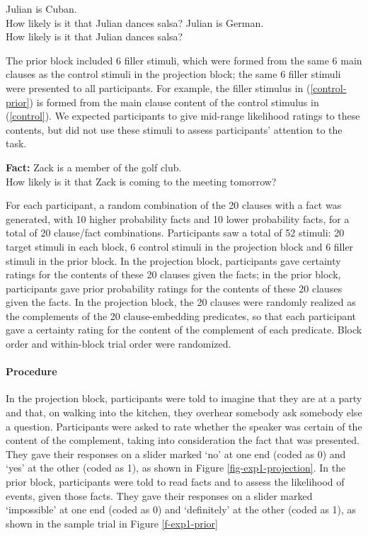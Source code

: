 \documentclass[11pt,fleqn]{article}
\newcommand{\6}{\mbox{$[\hspace*{-.6mm}[$}}
\newcommand{\9}{\mbox{$]\hspace*{-.6mm}]$}}
\begin{document}
\begin{exe}
\ex\label{target} 
\begin{xlist}
 Julian is Cuban. \\ How likely is it that Julian dances salsa?
 Julian is German. \\ How likely is it that Julian dances salsa?
\end{xlist}
\end{exe}
The prior block included 6 filler stimuli, which were formed from the same 6 main clauses as the control stimuli in the projection block; the same 6 filler stimuli were presented to all participants. For example, the filler stimulus in (\ref{control-prior}) is formed from the main clause content of the control stimulus in (\ref{control}). We expected participants to give mid-range likelihood ratings to these contents, but did not use these stimuli to assess participants' attention to the task.

\begin{exe}
\ex\label{control-prior} {\bf Fact:}  Zack is a member of the golf club. \\ How likely is it that Zack is coming to the meeting tomorrow?
\end{exe}

For each participant, a random combination of the 20 clauses with a fact was generated, with 10 higher probability facts and 10 lower probability facts, for a total of 20 clause/fact combinations. Participants saw a total of 52 stimuli: 20 target stimuli in each block, 6 control stimuli in the projection block and 6 filler stimuli in the prior block. In the projection block, participants gave certainty ratings for the contents of these 20 clauses given the facts; in the prior block, participants gave prior probability ratings for the contents of these 20 clauses given the facts. In the projection block, the 20 clauses were randomly realized as the complements of the 20 clause-embedding predicates, so that each participant gave a certainty rating for the content of the complement of each predicate. Block order and within-block trial order were randomized.

\paragraph{Procedure} In the projection block, participants were told to imagine that they are at a party and that, on walking into the kitchen, they overhear somebody ask somebody else a question. Participants were asked to rate whether the speaker was certain of the content of the complement, taking into consideration the fact that was presented. They gave their responses on a slider marked `no' at one end (coded as 0) and `yes' at the other (coded as 1), as shown in Figure \ref{fig-exp1-projection}. In the prior block, participants were told to read facts and to assess the likelihood of events, given those facts. They gave their responses on a slider marked `impossible' at one end (coded as 0) and `definitely' at the other (coded as 1), as shown in the sample trial in Figure \ref{f-exp1-prior}
\end{document}
